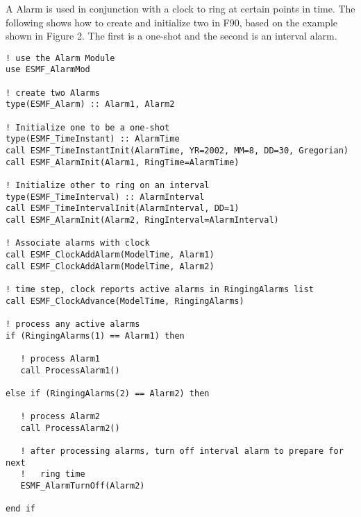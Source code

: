
A Alarm is used in conjunction with a clock to ring at certain points in time.
The following shows how to create and initialize two in F90, based on the
example shown in Figure 2.  The first is a one-shot and the second is an
interval alarm.

\begin{verbatim}
! use the Alarm Module
use ESMF_AlarmMod

! create two Alarms
type(ESMF_Alarm) :: Alarm1, Alarm2

! Initialize one to be a one-shot
type(ESMF_TimeInstant) :: AlarmTime
call ESMF_TimeInstantInit(AlarmTime, YR=2002, MM=8, DD=30, Gregorian)
call ESMF_AlarmInit(Alarm1, RingTime=AlarmTime)

! Initialize other to ring on an interval
type(ESMF_TimeInterval) :: AlarmInterval
call ESMF_TimeIntervalInit(AlarmInterval, DD=1)
call ESMF_AlarmInit(Alarm2, RingInterval=AlarmInterval)

! Associate alarms with clock
call ESMF_ClockAddAlarm(ModelTime, Alarm1)
call ESMF_ClockAddAlarm(ModelTime, Alarm2)

! time step, clock reports active alarms in RingingAlarms list
call ESMF_ClockAdvance(ModelTime, RingingAlarms)

! process any active alarms
if (RingingAlarms(1) == Alarm1) then

   ! process Alarm1
   call ProcessAlarm1()

else if (RingingAlarms(2) == Alarm2) then

   ! process Alarm2
   call ProcessAlarm2()

   ! after processing alarms, turn off interval alarm to prepare for next
   !   ring time
   ESMF_AlarmTurnOff(Alarm2)

end if
\end{verbatim}
